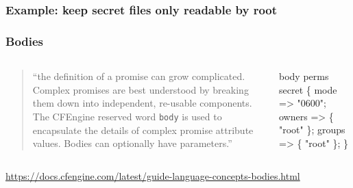 \documentclass[english,serif,mathserif,usenames,dvipsnames]{beamer}
\begin{document}
\begin{frame}[fragile]
  \frametitle{Example: keep secret files only readable by root}

\end{frame}


\begin{frame}[fragile]
  \frametitle{Bodies}
  \begin{columns}
    \begin{column}{0.75\linewidth}
      \begin{quote}
        ``the definition of a promise can grow complicated. Complex
        promises are best understood by breaking them down into
        independent, re-usable components. The CFEngine reserved word
        \texttt{body} is used to encapsulate the details of complex
        promise attribute values. Bodies can optionally have
        parameters.''
      \end{quote}
    \end{column}
    \begin{column}{0.5\linewidth}
\begin{semiverbatim}\small
body perms secret \{
 mode   => "0600";
 owners => \{ "root" \};
 groups => \{ "root" \};
\}
\end{semiverbatim}

\+
    \end{column}
  \end{columns}
  \begin{references}
    \url{https://docs.cfengine.com/latest/guide-language-concepts-bodies.html}
  \end{references}
\end{frame}
\end{document}

